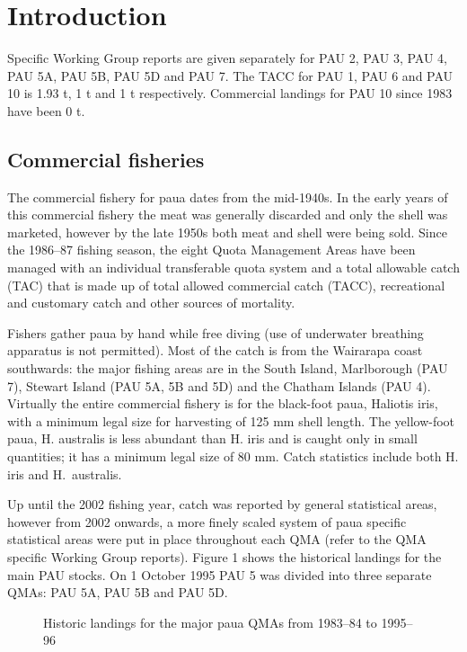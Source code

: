 \documentclass{mpi-plenary}
\theoremstyle{definition}
\theoremstyle{definition}
\theoremstyle{definition}
\theoremstyle{remark}
\begin{document}
\section{Introduction}\label{introduction-1}

Specific Working Group reports are given separately for PAU 2, PAU 3,
PAU 4, PAU 5A, PAU 5B, PAU 5D and PAU 7. The TACC for PAU 1, PAU 6 and
PAU 10 is 1.93 t, 1 t and 1 t respectively. Commercial landings for PAU
10 since 1983 have been 0 t.

\subsection{Commercial fisheries}\label{commercial-fisheries}

The commercial fishery for paua dates from the mid-1940s. In the early
years of this commercial fishery the meat was generally discarded and
only the shell was marketed, however by the late 1950s both meat and
shell were being sold. Since the 1986--87 fishing season, the eight
Quota Management Areas have been managed with an individual transferable
quota system and a total allowable catch (TAC) that is made up of total
allowed commercial catch (TACC), recreational and customary catch and
other sources of mortality.

Fishers gather paua by hand while free diving (use of underwater
breathing apparatus is not permitted). Most of the catch is from the
Wairarapa coast southwards: the major fishing areas are in the South
Island, Marlborough (PAU 7), Stewart Island (PAU 5A, 5B and 5D) and the
Chatham Islands (PAU 4). Virtually the entire commercial fishery is for
the black-foot paua, Haliotis iris, with a minimum legal size for
harvesting of 125 mm shell length. The yellow-foot paua, H. australis is
less abundant than H. iris and is caught only in small quantities; it
has a minimum legal size of 80 mm. Catch statistics include both H. iris
and H.~australis.

Up until the 2002 fishing year, catch was reported by general
statistical areas, however from 2002 onwards, a more finely scaled
system of paua specific statistical areas were put in place throughout
each QMA (refer to the QMA specific Working Group reports). Figure 1
shows the historical landings for the main PAU stocks. On 1 October 1995
PAU 5 was divided into three separate QMAs: PAU 5A, PAU 5B and PAU 5D.

\begin{figure}

\caption{Historic landings for the major paua QMAs from 1983–84 to 1995–96}\label{fig:weight-by-fishing-year-1}
\end{figure}
\end{document}
